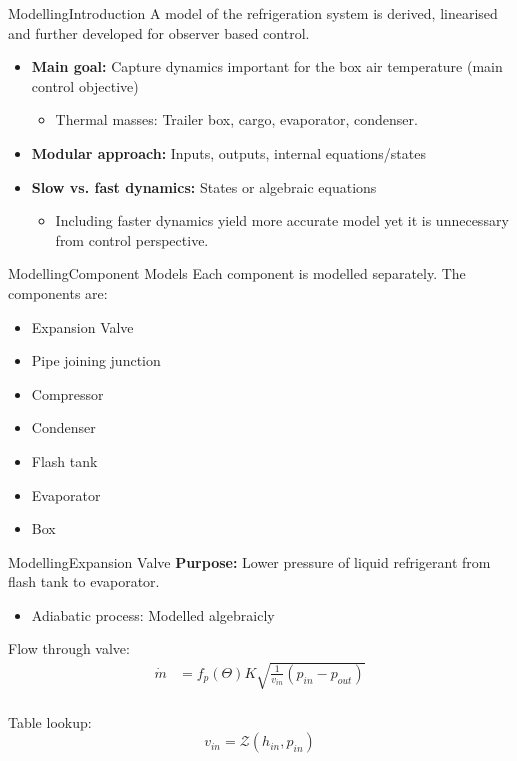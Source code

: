 \begin{frame}{Modelling}{Introduction}
	A model of the refrigeration system is derived, linearised and further developed for observer based control.
	\begin{itemize}
		\item \textbf{Main goal:} Capture dynamics important for the box air temperature (main control objective)
		\begin{itemize}
			\item Thermal masses: Trailer box, cargo, evaporator, condenser.
		\end{itemize}
		\item \textbf{Modular approach:} Inputs, outputs, internal equations/states
		\item \textbf{Slow vs. fast dynamics:} States or algebraic equations
		\begin{itemize}
			\item Including faster dynamics yield more accurate model yet it is unnecessary from control perspective.
		\end{itemize}		
	\end{itemize}
\end{frame}




\begin{frame}{Modelling}{Component Models}
	Each component is modelled separately. The components are:
	\begin{itemize}
		\item Expansion Valve
		\item Pipe joining junction
		\item Compressor
		\item Condenser
		\item Flash tank
		\item Evaporator
		\item Box
	\end{itemize}
\end{frame}




\begin{frame}{Modelling}{Expansion Valve}
	\textbf{Purpose:} Lower pressure of liquid refrigerant from flash tank to evaporator.
	\begin{itemize}
		\item Adiabatic process: Modelled algebraicly
	\end{itemize}
	Flow through valve:
	\begin{equation} \label{eq:ExpansionValve_Alt}
		\begin{split}
			\dot{m} & = f_p(\Theta) K  \sqrt{\frac{1}{v_{in}} (p_{in} - p_{out})} \\
		\end{split}
	\end{equation}

	Table lookup:
	\begin{equation} \label{eq:ExpansionValve_vin}
		v_{in} = \mathcal{Z}(h_{in}, p_{in})
	\end{equation}
\end{frame}



